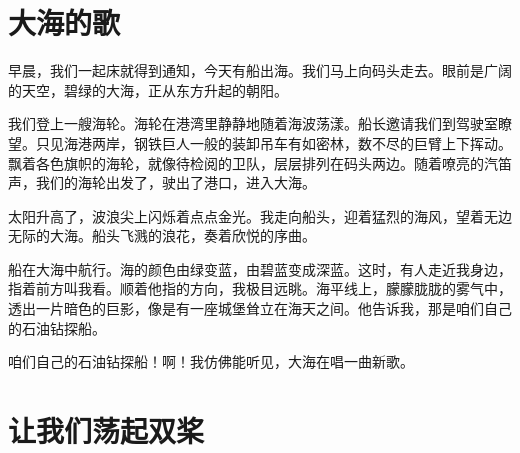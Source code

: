 \documentclass[12pt,UTF-8,openany]{ctexbook}
\begin{document}
\chapter{大海的歌}

\begin{Large}
    
    早晨，我们一起床就得到通知，今天有船出海。我们马上向码头走去。眼前是广阔的天空，碧绿的大海，正从东方升起的朝阳。
    
    我们登上一艘海轮。海轮在港湾里静静地随着海波荡漾。船长邀请我们到驾驶室瞭望。只见海港两岸，钢铁巨人一般的装卸吊车有如密林，数不尽的巨臂上下挥动。飘着各色旗帜的海轮，就像待检阅的卫队，层层排列在码头两边。随着嘹亮的汽笛声，我们的海轮出发了，驶出了港口，进入大海。
    
    太阳升高了，波浪尖上闪烁着点点金光。我走向船头，迎着猛烈的海风，望着无边无际的大海。船头飞溅的浪花，奏着欣悦的序曲。
    
    船在大海中航行。海的颜色由绿变蓝，由碧蓝变成深蓝。这时，有人走近我身边，指着前方叫我看。顺着他指的方向，我极目远眺。海平线上，朦朦胧胧的雾气中，透出一片暗色的巨影，像是有一座城堡耸立在海天之间。他告诉我，那是咱们自己的石油钻探船。
    
    咱们自己的石油钻探船！啊！我仿佛能听见，大海在唱一曲新歌。
    
\end{Large}

\chapter{让我们荡起双桨}
\end{document}
